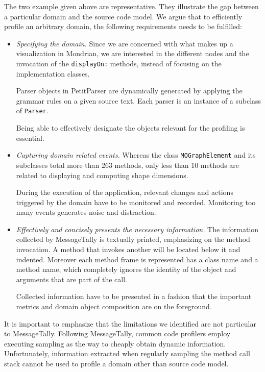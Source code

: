\documentclass[runningheads]{llncs}
\newcommand{\ct}{\lstinline[backgroundcolor=\color{white},basicstyle=\footnotesize\ttfamily]}
\begin{document}
The two example given above are representative. They illustrate the gap between a particular domain and the source code model. We argue that to efficiently profile an arbitrary domain, the following requirements needs to be fulfilled:

\begin{itemize}
\item \emph{Specifying the domain.} Since we are concerned with what makes up a visualization in Mondrian, we are interested in the different nodes and the invocation of the \ct{displayOn:} methods, instead of focusing on the implementation classes. 

Parser objects in PetitParser are dynamically generated by applying the grammar rules on a given source text. Each parser is an instance of a subclass of \ct{Parser}. 

Being able to effectively designate the objects relevant for the profiling is essential.

\item \emph{Capturing domain related events.}
Whereas the class \ct{MOGraphElement} and its subclasses total more than 263 methods, only less than 10 methods are related to displaying and computing shape dimensions. 

 During the execution of the application, relevant changes and actions triggered by the domain have to be monitored and recorded. Monitoring too many events generates noise and distraction. 
 
\item \emph{Effectively and concisely presents the necessary information.} 
The information collected by MessageTally is textually printed, emphasizing on the method invocation. A method that invokes another will be located below it and indented. Moreover each method frame is represented has a class name and a method name, which completely ignores the identity of the object and arguments that are part of the call.

Collected information have to be presented in a fashion that the important metrics and domain object composition are on the foreground.  

\end{itemize}

It is important to emphasize that the limitations we identified are not particular to MessageTally. Following MessageTally, common code profilers employ executing sampling as the way to cheaply obtain dynamic information. Unfortunately, information extracted when regularly sampling the method call stack cannot be used to profile a domain other than source code model.
\end{document}
